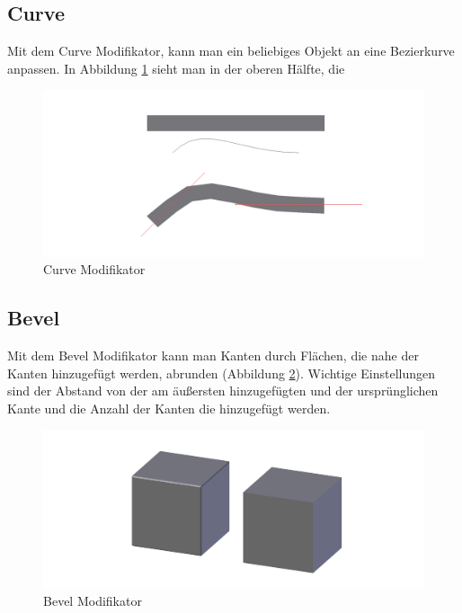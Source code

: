 \subsection{Curve}
\citep{blender:curve_modifier} Mit dem Curve Modifikator, kann man ein beliebiges Objekt an eine Bezierkurve anpassen. In Abbildung \ref{modifikatoren:image4} sieht man
in der oberen Hälfte, die
\begin{figure}[h]
    \centering
    \includegraphics[width=.8\textwidth]{images/Modifikatoren-Curve.png}
    \caption{Curve Modifikator}
    \label{modifikatoren:image4}
\end{figure}

\subsection{Bevel}
Mit dem Bevel Modifikator \citep{blender:bevel_modifier} kann man Kanten durch Flächen, die nahe der Kanten hinzugefügt werden, abrunden (Abbildung \ref{modifikatoren:image5}).
Wichtige Einstellungen sind der Abstand von der am äußersten hinzugefügten und der ursprünglichen Kante und die Anzahl der Kanten die hinzugefügt werden.

\begin{figure}[h]
    \centering
    \includegraphics[width=.8\textwidth]{images/Modifikatoren-Bevel.png}
    \caption{Bevel Modifikator}
    \label{modifikatoren:image5}
\end{figure}

